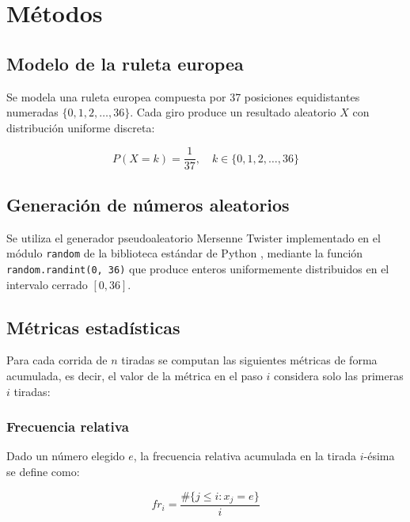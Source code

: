 \documentclass[a4paper, 11pt]{article}
\begin{document}
\section{Métodos}

\subsection{Modelo de la ruleta europea}

Se modela una ruleta europea compuesta por 37 posiciones equidistantes
numeradas $\{0, 1, 2, \ldots, 36\}$. Cada giro produce un resultado
aleatorio $X$ con distribución uniforme discreta:

\begin{equation}
  P(X = k) = \frac{1}{37}, \quad k \in \{0, 1, 2, \ldots, 36\}
  \label{eq:prob_uniforme}
\end{equation}

\subsection{Generación de números aleatorios}

Se utiliza el generador pseudoaleatorio Mersenne Twister implementado en el
módulo \texttt{random} de la biblioteca estándar de Python
\cite{python_random}, mediante la función \texttt{random.randint(0, 36)} que
produce enteros uniformemente distribuidos en el intervalo cerrado $[0, 36]$.

\subsection{Métricas estadísticas}

Para cada corrida de $n$ tiradas se computan las siguientes métricas de forma
acumulada, es decir, el valor de la métrica en el paso $i$ considera solo las
primeras $i$ tiradas:

\subsubsection*{Frecuencia relativa}

Dado un número elegido $e$, la frecuencia relativa acumulada en la tirada
$i$-ésima se define como:

\begin{equation}
  fr_i = \frac{\#\{j \leq i : x_j = e\}}{i}
  \label{eq:freq_relativa}
\end{equation}
\end{document}
